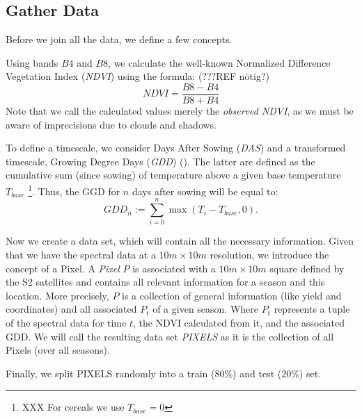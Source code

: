 	\subsection{Gather Data}{
		\label{sec:gather_data_to_pixel}
		Before we join all the data, we define a few concepts.

		{%
			Using bands $B4$ and $B8$, we calculate the well-known Normalized Difference Vegetation Index (\textit{NDVI}) using the formula: (???REF nötig?)
			\begin{equation}
				NDVI = \frac{B8 - B4}{B8 + B4}
				\label{eq:ndvi}
			\end{equation}
			Note that we call the calculated values merely the \textit{observed NDVI}, as we must be aware of imprecisions due to clouds and shadows. 
		}

		{%
			To define a timescale, we consider Days After Sowing (\textit{DAS}) and a transformed timescale, Growing Degree Days (\textit{GDD}) (\cite{mcmasterGrowingDegreedaysOne1997}). The latter are defined as the cumulative sum (since sowing) of temperature above a given base temperature $T_{base}$ \footnote{XXX For cereals we use $T_{base}=0$ }. Thus, the GGD for $n$ days after sowing will be equal to:
			\begin{equation}
				\label{eq:gdd}
				GDD_n := \sum_{i=0}^n \max(T_i - T_{base}, 0).
			\end{equation}
		} 

		Now we create a data set, which will contain all the necessary information. Given that we have the spectral data at a $10m \times 10m$ resolution, we introduce the concept of a Pixel. A \textit{Pixel} $P$ is associated with a $10m \times 10m$ square defined by the S2 satellites and contains all relevant information for a season and this location. More precisely, $P$ is a collection of general information (like yield and coordinates) and all associated $P_t$ of a given season. Where $P_t$ represents a tuple of the spectral data for time $t$, the NDVI calculated from it, and the associated GDD. 
		We will call the resulting data set \textit{PIXELS} as it is the collection of all Pixels (over all seasons). 
		
		Finally, we split PIXELS randomly into a train ($80\%$) and test  ($20\%$) set. 

	}

